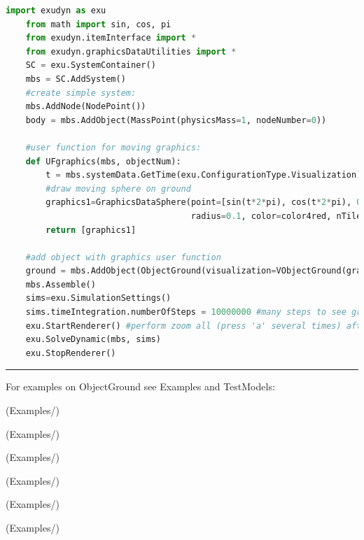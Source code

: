     \begin{lstlisting}[language=Python]
    import exudyn as exu
    from math import sin, cos, pi
    from exudyn.itemInterface import *
    from exudyn.graphicsDataUtilities import *
    SC = exu.SystemContainer()
    mbs = SC.AddSystem()
    #create simple system:
    mbs.AddNode(NodePoint())
    body = mbs.AddObject(MassPoint(physicsMass=1, nodeNumber=0))
    
    #user function for moving graphics:
    def UFgraphics(mbs, objectNum):
        t = mbs.systemData.GetTime(exu.ConfigurationType.Visualization) #get time if needed
        #draw moving sphere on ground
        graphics1=GraphicsDataSphere(point=[sin(t*2*pi), cos(t*2*pi), 0], 
                                     radius=0.1, color=color4red, nTiles=32)
        return [graphics1] 

    #add object with graphics user function
    ground = mbs.AddObject(ObjectGround(visualization=VObjectGround(graphicsDataUserFunction=UFgraphics)))
    mbs.Assemble()
    sims=exu.SimulationSettings()
    sims.timeIntegration.numberOfSteps = 10000000 #many steps to see graphics
    exu.StartRenderer() #perform zoom all (press 'a' several times) after startup to see the sphere
    exu.SolveDynamic(mbs, sims)
    exu.StopRenderer()
    \end{lstlisting}
\vspace{6pt}\par\noindent\rule{\textwidth}{0.4pt}
%
\noindent For examples on ObjectGround see Examples and TestModels:
\bi
\item {} (Examples/)
\item {} (Examples/)
\item {} (Examples/)
\item {} (Examples/)
\item {} (Examples/)
\item {} (Examples/)

